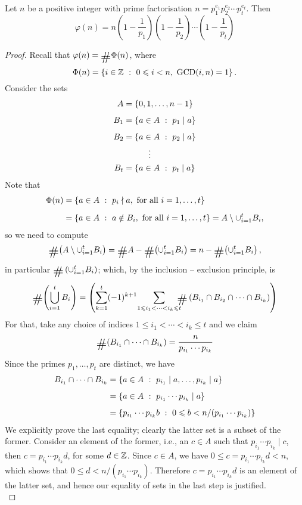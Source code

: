 \begin{theorem}\label{totientform}
Let $n$ be a positive integer with prime factorisation $n = p_1^{e_1}p_2^{e_2}\cdots p_t^{e_t}$. Then 
\[\varphi(n) = n\left(1 - \frac{1}{p_1}\right)\left(1 - \frac{1}{p_2}\right)\cdots\left(1 - \frac{1}{p_t}\right)\]
\end{theorem}
\begin{proof}
Recall that $\varphi(n) = \card\Phi(n)$, where 
\[\Phi(n) = \left\{i \in \mathbb Z\ :\ 0 \leqslant i < n,\ \operatorname{GCD}(i,n) = 1\right\}.\]
Consider the sets
\begin{align*}
A &= \left\{0,1,\ldots,n-1\right\}\\[0.5em]
B_1 &= \left\{a \in A\ :\ p_1 \mid a\right\}\\[0.5em]
B_2 &= \left\{a \in A\ :\ p_2 \mid a\right\}\\
&\qquad\quad \vdots\\
B_t &= \left\{a \in A\ :\ p_t \mid a\right\}
\end{align*}
Note that 
\begin{align*}
\Phi(n) &= \left\{a \in A\ :\ p_i \nmid a,\ \text{for all $i = 1,\ldots,t$}\right\}\\[0.5em]
&= \left\{a \in A\ :\ a \notin B_i,\ \text{for all $i = 1,\ldots,t$}\right\} = A\setminus \cup_{i = 1}^t B_i,
\end{align*}
so we need to compute \[\card\!\left(A\setminus \cup_{i = 1}^t B_i\right) = \card A - \card\!\left(\cup_{i = 1}^t B_i\right) = n - \card\!\left(\cup_{i = 1}^t B_i\right),\]
in particular $\card\left(\cup_{i = 1}^t B_i\right)$; which, by the inclusion – exclusion principle, is
\[\card\!\left(\bigcup_{i = 1}^t B_i\right) = \left(\sum_{k = 1}^t (-1)^{k+1}{\sum_{1\leq i_1 < \cdots < i_k \leq t}}\!\!\! \card\left(B_{i_1} \cap B_{i_2} \cap \cdots \cap B_{i_k}\right)\right)\]
For that, take any choice of indices $1 \leq i_1 < \cdots < i_k \leq t$ and we claim
\[\card\!\left(B_{i_1} \cap \cdots \cap B_{i_k}\right) = \frac{n}{p_{i_1}\cdots p_{i_k}}\]
Since the primes $p_1,\ldots,p_t$ are distinct, we have
\begin{align*}
B_{i_1} \cap \cdots \cap B_{i_k} &= \left\{a \in A\ :\ p_{i_1}\mid a,\ldots, p_{i_k}\mid a\right\}\\[0.5em]
&= \left\{a \in A\ :\ p_{i_1}\cdots p_{i_k}\mid a\right\}\\[0.5em]
&= \left\{p_{i_1}\cdots p_{i_k} b\ :\ 0 \leqslant b <  n/(p_{i_1}\cdots p_{i_k})\right\}
\end{align*}
We explicitly prove the last equality; clearly the latter set is a subset of the former. Consider an element of the former, i.e., an $c \in A$ such that $p_{i_1}\cdots p_{i_k}\mid c$, then $c = p_{i_1}\cdots p_{i_k} d$, for some $d \in \mathbb Z$. Since $c \in A$, we have $0 \leq c = p_{i_1}\cdots p_{i_k} d < n$, which shows that $0 \leq d < n/(p_{i_1}\cdots p_{i_k})$. Therefore $c = p_{i_1}\cdots p_{i_k} d$ is an element of the latter set, and hence our equality of sets in the last step is justified.\\

\end{proof}
